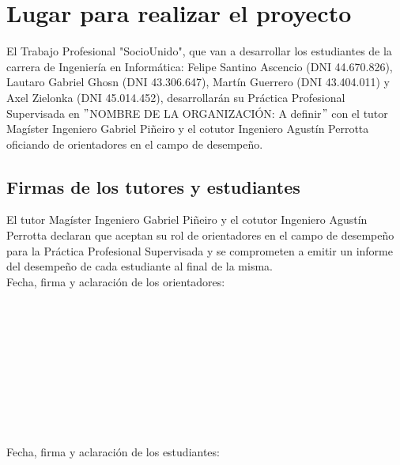 \section{Lugar para realizar el proyecto}

El Trabajo Profesional "SocioUnido", que van a desarrollar los estudiantes de la carrera de Ingeniería en Informática: Felipe Santino Ascencio (DNI 44.670.826), Lautaro Gabriel Ghosn (DNI 43.306.647), Martín Guerrero (DNI 43.404.011) y Axel Zielonka (DNI 45.014.452), desarrollarán su Práctica Profesional Supervisada en $"$NOMBRE DE LA ORGANIZACIÓN: A definir$"$ con el tutor Magíster Ingeniero Gabriel Piñeiro y el cotutor Ingeniero Agustín Perrotta oficiando de orientadores en el campo de desempeño.

\subsection{Firmas de los tutores y estudiantes}

El tutor Magíster Ingeniero Gabriel Piñeiro y el cotutor Ingeniero Agustín Perrotta declaran que aceptan su rol de orientadores en el campo de desempeño para la Práctica Profesional Supervisada y se comprometen a emitir un informe del desempeño de cada estudiante al final de la misma.
\\

Fecha, firma y aclaración de los orientadores: 
\\
\\
\\
\\
\\
\\
\\
\\
\\
\\
\\

Fecha, firma y aclaración de los estudiantes: 
\\
